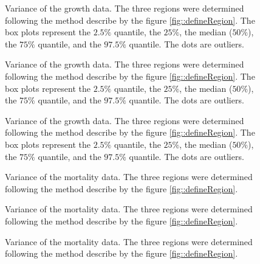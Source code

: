 \documentclass[letterpaper, 12pt]{article}
\theoremstyle{theo}
\begin{document}
\begin{refsection}
\begin{onehalfspace}
\begin{figure}
	\centering
	
	\caption{Variance of the growth data. The three regions were determined following the method describe by the figure \ref{fig::defineRegion}. The box plots represent the $ 2.5 \%$ quantile, the $ 25 \% $, the median ($ 50 \% $), the $ 75 \% $ quantile, and the $ 97.5 \% $ quantile. The dots are outliers. \label{fig::growthVar7-9}}
\end{figure}

\begin{figure}
	\centering
	
	\caption{Variance of the growth data. The three regions were determined following the method describe by the figure \ref{fig::defineRegion}. The box plots represent the $ 2.5 \%$ quantile, the $ 25 \% $, the median ($ 50 \% $), the $ 75 \% $ quantile, and the $ 97.5 \% $ quantile. The dots are outliers. \label{fig::growthVar10-12}}
\end{figure}

\begin{figure}
	\centering
	
	\caption{Variance of the growth data. The three regions were determined following the method describe by the figure \ref{fig::defineRegion}. The box plots represent the $ 2.5 \%$ quantile, the $ 25 \% $, the median ($ 50 \% $), the $ 75 \% $ quantile, and the $ 97.5 \% $ quantile. The dots are outliers. \label{fig::growthVar13-14}}
\end{figure}

\begin{figure}
	\centering
	
	\caption{Variance of the mortality data. The three regions were determined following the method describe by the figure \ref{fig::defineRegion}. \label{fig::mortalityVar1-3}}
\end{figure}

\begin{figure}
	\centering
	
	\caption{Variance of the mortality data. The three regions were determined following the method describe by the figure \ref{fig::defineRegion}. \label{fig::mortalityVa4-6}}
\end{figure}

\begin{figure}
	\centering
	
	\caption{Variance of the mortality data. The three regions were determined following the method describe by the figure \ref{fig::defineRegion}. \label{fig::mortalityVa7-9}}
\end{figure}


\end{onehalfspace}
\end{refsection}
\end{document}
